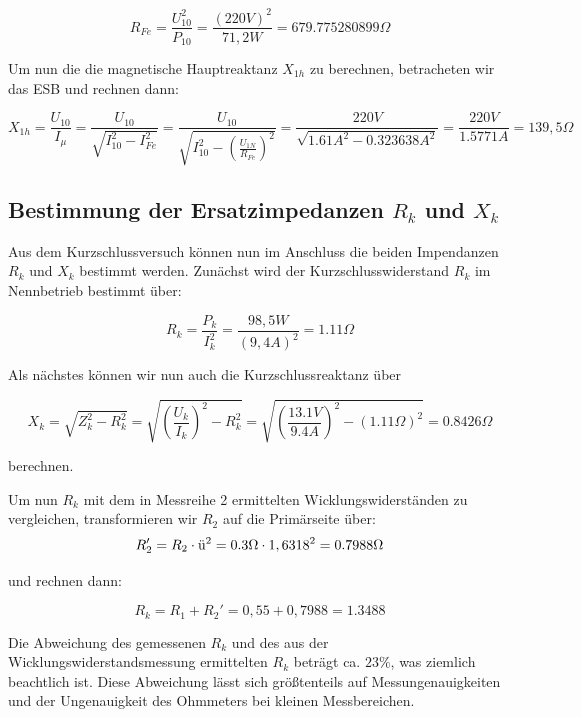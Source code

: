 \documentclass{article}
\begin{document}
\begin{equation*}
  R_{Fe} = \frac{U_{10}^{2}}{P_{10}} = \frac{(220V)^{2}}{71,2W} = 679.775280899\Omega
\end{equation*}

Um nun die die magnetische Hauptreaktanz $X_{1h}$ zu berechnen, betracheten wir das ESB und rechnen dann:

\begin{equation*}
  X_{1h} = \frac{U_{10}}{I_{\mu}} = \frac{U_{10}}{\sqrt{I_{10}^{2}-I_{Fe}^{2}}} = \frac{U_{10}}{\sqrt{I_{10}^{2}-\left(\frac{U_{1N}}{R_{Fe}}\right)^{2}}} = \frac{220V}{\sqrt{1.61A^{2}-0.323638A^{2}}} = \frac{220V}{1.5771A} = 139,5\Omega
\end{equation*}

\subsection{Bestimmung der Ersatzimpedanzen $R_{k}$ und $X_{k}$}
\label{sec:best-der-ersatz-1}

Aus dem Kurzschlussversuch können nun im Anschluss die beiden Impendanzen $R_{k}$ und $X_{k}$ bestimmt werden. Zunächst wird der Kurzschlusswiderstand $R_{k}$ im Nennbetrieb bestimmt über:

\begin{equation*}
  R_{k} = \frac{P_{k}}{I_{k}^{2}} = \frac{98,5W}{(9,4A)^{2}} = 1.11\Omega
\end{equation*}

Als nächstes können wir nun auch die Kurzschlussreaktanz über

\begin{equation*}
  X_{k} = \sqrt{Z_{k}^{2}-R_{k}^{2}} = \sqrt{\left(\frac{U_{k}}{I_{k}}\right)^{2}-R_{k}^{2}} = \sqrt{\left(\frac{13.1V}{9.4A}\right)^{2} - (1.11\Omega)^{2}} = 0.8426\Omega
\end{equation*}

berechnen.

Um nun $R_{k}$ mit dem in Messreihe 2 ermittelten Wicklungswiderständen zu vergleichen, transformieren wir $R_{2}$ auf die Primärseite über:
\[
  R_{2}' = R_{2}\cdot \textnormal{ü}^{2} = 0.3\Omega \cdot 1,6318^{2} = 0.7988\Omega
\]

und rechnen dann:

\[
  R_{k} = R_{1} + R_{2}' = 0,55 + 0,7988 = 1.3488
\]

Die Abweichung des gemessenen $R_{k}$ und des aus der Wicklungswiderstandsmessung ermittelten $R_{k}$ beträgt ca. $23\%$, was ziemlich beachtlich ist. Diese Abweichung lässt sich größtenteils auf Messungenauigkeiten und der Ungenauigkeit des Ohmmeters bei kleinen Messbereichen.
\end{document}
